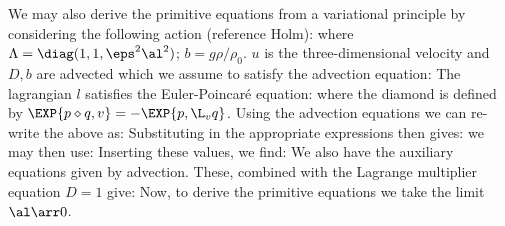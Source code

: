 We may also derive the primitive equations from a variational principle by considering the following action (reference Holm):
where $\Lambda = \diag(1,1,\eps^{2}\al^{2})$; $b = g\rho/\rho_{0}$. $u$ is the three-dimensional velocity and $D,b$ are advected  which we assume to satisfy the advection equation:
The lagrangian $l$ satisfies the Euler-Poincar\'{e} equation:
where the diamond is defined by $\EXP{p\diamond q, v} = -\EXP{p,\L_{v}q}$. Using the advection equations we can re-write the above as:
Substituting in the appropriate expressions then gives:
we may then use:
Inserting these values, we find:
We also have the auxiliary equations given by advection. These, combined with the Lagrange multiplier equation $D=1$ give:
Now, to derive the primitive equations we take the limit $\al\arr 0$. 
\fi

